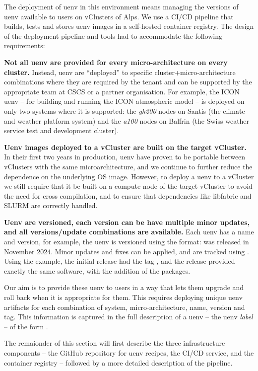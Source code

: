 The deployment of uenv in this environment means managing the versions of uenv available to users on vClusters of Alps.
We use a CI/CD pipeline that builds, tests and stores uenv images in a self-hosted container registry.
The design of the deployment pipeline and tools had to accommodate the following requirements:

\textbf{Not all uenv are provided for every micro-architecture on every cluster.}
Instead, uenv are ``deployed'' to specific cluster+micro-architecture combinations where they are required by the tenant and can be supported by the appropriate team at CSCS or a partner organisation.
For example, the ICON uenv -- for building and running the ICON atmospheric model -- is deployed on only two systems where it is supported: the \emph{gh200} nodes on Santis (the climate and weather platform system) and the \emph{a100} nodes on Balfrin (the Swiss weather service test and development cluster).

\textbf{Uenv images deployed to a vCluster are built on the target vCluster.}
In their first two years in production, uenv have proven to be portable between vClusters with the same microarchitecture, and we continue to further reduce the dependence on the underlying OS image.
However, to deploy a uenv to a vCluster we still require that it be built on a compute node of the target vCluster to avoid the need for cross compilation, and to ensure that dependencies like libfabric and SLURM are correctly handled.

\textbf{Uenv are versioned, each version can be have multiple minor updates, and all versions/update combinations are available.}
Each uenv has a name and version, for example, the  uenv is versioned using the  format:  was released in November 2024.
Minor updates and fixes can be applied, and are tracked using .
Using the  example, the initial release had the tag , and the  release provided exactly the same software, with the addition of the  packages.

Our aim is to provide these uenv to users in a way that lets them upgrade and roll back when it is appropriate for them.
This requires deploying unique uenv artifacts for each combination of system, micro-architecture, name, version and tag.
This information is captured in the full description of a uenv -- the uenv \emph{label} -- of the form .

The remaionder of this section will first describe the three infrastructure components -- the GitHub repository for uenv recipes, the CI/CD service, and the container registry -- followed by a more detailed description of the pipeline.

